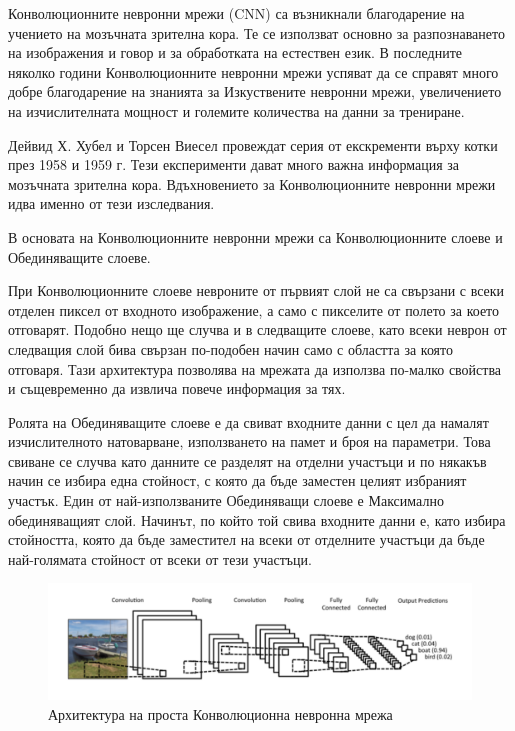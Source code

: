 \documentclass{article}
\begin{document}
Конволюционните невронни мрежи (CNN) са възникнали благодарение на учението на мозъчната зрителна кора. Те се използват
основно за разпознаването на изображения и говор и за обработката на естествен език. В последните няколко години
Конволюционните невронни мрежи успяват да се справят много добре благодарение на знанията за Изкуствените невронни
мрежи, увеличението на изчислителната мощност и големите количества на данни за трениране.

Дейвид Х. Хубел и Торсен Виесел провеждат серия от екскременти върху котки през 1958 и 1959 г. Тези експерименти дават
много важна информация за мозъчната зрителна кора. Вдъхновението за Конволюционните невронни мрежи идва именно от тези
изследвания.

В основата на Конволюционните невронни мрежи са Конволюционните слоеве и Обединяващите слоеве.

При Конволюционните слоеве невроните от първият слой не са свързани с всеки отделен пиксел от входното изображение, а
само с пикселите от полето за което отговарят. Подобно нещо ще случва и в следващите слоеве, като всеки неврон от
следващия слой бива свързан по-подобен начин само с областта за която отговаря. Тази архитектура позволява на мрежата
да използва по-малко свойства и същевременно да извлича повече информация за тях.

Ролята на Обединяващите слоеве е да свиват входните данни с цел да намалят изчислителното натоварване, използването на
памет и броя на параметри. Това свиване се случва като данните се разделят на отделни участъци и по някакъв начин се
избира една стойност, с която да бъде заместен целият избраният участък. Един от най-използваните Обединяващи слоеве е
Максимално обединяващият слой. Начинът, по който той свива входните данни е, като избира стойността, която да бъде
заместител на всеки от отделните участъци да бъде най-голямата стойност от всеки от тези участъци. \cite{hands-on-ml}

\begin{figure}[H]
    \centering
    \captionsetup{justification=centering}
    \includegraphics[width=450px, keepaspectratio]{chapter-03/cnn.png}
    \caption{Архитектура на проста Конволюционна невронна мрежа}
\end{figure}
\end{document}
